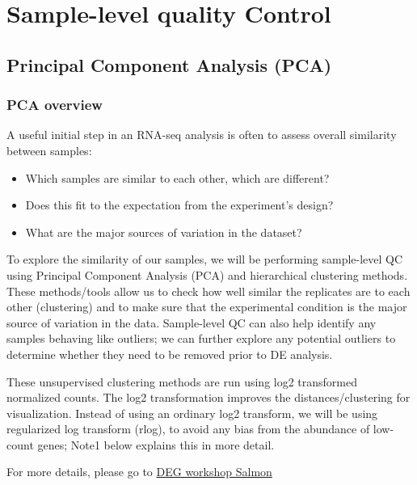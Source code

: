 \documentclass[
]{article}
\begin{document}
\section{Sample-level quality
Control}\label{sample-level-quality-control}

\subsection{Principal Component Analysis
(PCA)}\label{principal-component-analysis-pca}

\subsubsection{PCA overview}\label{pca-overview}

A useful initial step in an RNA-seq analysis is often to assess overall
similarity between samples:

\begin{itemize}
\item
  Which samples are similar to each other, which are different?
\item
  Does this fit to the expectation from the experiment's design?
\item
  What are the major sources of variation in the dataset?
\end{itemize}

To explore the similarity of our samples, we will be performing
sample-level QC using Principal Component Analysis (PCA) and
hierarchical clustering methods. These methods/tools allow us to check
how well similar the replicates are to each other (clustering) and to
make sure that the experimental condition is the major source of
variation in the data. Sample-level QC can also help identify any
samples behaving like outliers; we can further explore any potential
outliers to determine whether they need to be removed prior to DE
analysis.

These unsupervised clustering methods are run using log2 transformed
normalized counts. The log2 transformation improves the
distances/clustering for visualization. Instead of using an ordinary
log2 transform, we will be using regularized log transform (rlog), to
avoid any bias from the abundance of low-count genes; Note1 below
explains this in more detail.

For more details, please go to
\href{https://github.com/zilanwen/DGE_workshop_salmon_online/blob/master/lessons/03_DGE_QC_analysis.md}{DEG
workshop Salmon}
\end{document}
